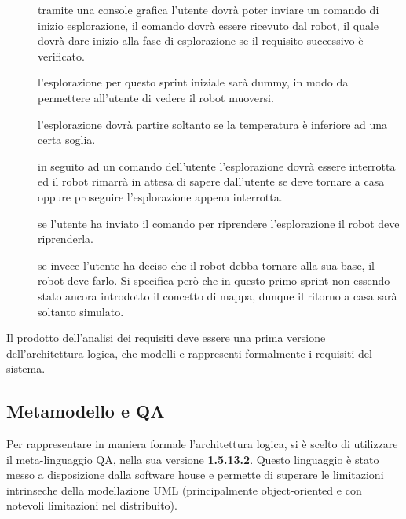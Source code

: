 \begin{description}
  \item[]
    tramite una console grafica l'utente dovrà poter inviare un comando di inizio esplorazione, il comando dovrà essere ricevuto dal robot, il quale dovrà dare inizio alla fase di esplorazione se il requisito successivo è verificato.
  \item[]
    l'esplorazione per questo sprint iniziale sarà dummy, in modo da permettere all'utente di vedere il robot muoversi.
  \item[]
    l'esplorazione dovrà partire soltanto se la temperatura è inferiore ad una certa soglia.
  \item[]
    in seguito ad un comando dell'utente l'esplorazione dovrà essere interrotta ed il robot rimarrà in attesa di sapere dall'utente se deve tornare a casa oppure proseguire l'esplorazione appena interrotta.
  \item[]
    se l'utente ha inviato il comando per riprendere l'esplorazione il robot deve riprenderla.
  \item[]
    se invece l'utente ha deciso che il robot debba tornare alla sua base, il robot deve farlo.
    Si specifica però che in questo primo sprint non essendo stato ancora introdotto il concetto di mappa, dunque il ritorno a casa sarà soltanto simulato.
\end{description}

Il prodotto dell'analisi dei requisiti deve essere una prima versione dell'architettura logica, che modelli e rappresenti formalmente i requisiti del sistema.

\subsection{Metamodello e QA}

Per rappresentare in maniera formale l'architettura logica, si è scelto di utilizzare il meta-linguaggio QA, nella sua versione \textbf{1.5.13.2}.
Questo linguaggio è stato messo a disposizione dalla software house e permette di superare le limitazioni intrinseche della modellazione UML
(principalmente object-oriented e con notevoli limitazioni nel distribuito).

